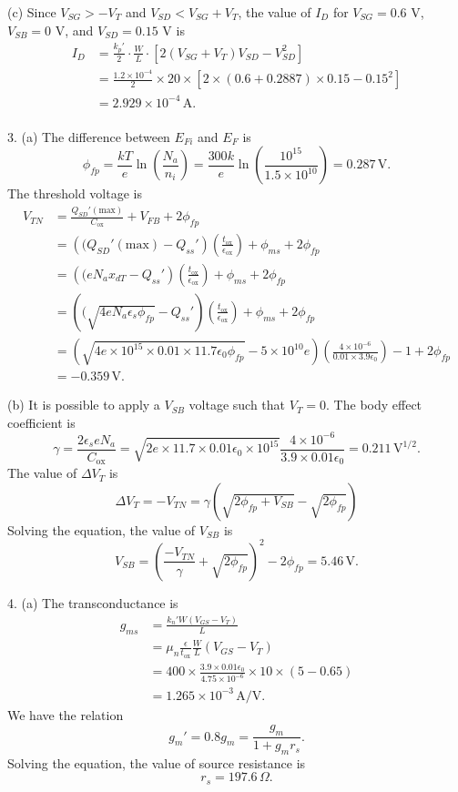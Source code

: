 \documentclass[a4paper]{article}
\begin{document}
(c) Since $V_{SG}>-V_T$ and $V_{SD}<V_{SG}+V_T$, the value of $I_D$ for $V_{SG}=0.6$ V, $V_{SB}=0$ V, and $V_{SD}=0.15$ V is
\[
    \begin{aligned}    
        I_D&=\frac{k_p'}{2}\cdot\frac{W}{L}\cdot\left[2\left(V_{SG}+V_T\right)V_{SD}-V_{SD}^2\right]\\
        &=\frac{1.2\times10^{-4}}{2}\times20\times\left[2\times\left(0.6+0.2887\right)\times0.15-0.15^2\right]\\
        &=2.929\times10^{-4}\,\text{A}.\\
    \end{aligned}
\]

3. (a) The difference between $E_{Fi}$ and $E_F$ is
\[\phi_{fp}=\frac{kT}{e}\ln{\left(\frac{N_a}{n_i}\right)}=\frac{300k}{e}\ln{\left(\frac{10^{15}}{1.5\times10^{10}}\right)}=0.287\,\text{V}.\]
The threshold voltage is
\[
    \begin{aligned}
        V_{TN}&=\frac{Q_{SD}'(\text{max})}{C_\text{ox}}+V_{FB}+2\phi_{fp}\\
        &=\left((Q_{SD}'(\text{max})-Q_{ss}'\right)\left(\frac{t_\text{ox}}{\epsilon_\text{ox}}\right)+\phi_{ms}+2\phi_{fp}\\
        &=\left((eN_ax_{dT}-Q_{ss}'\right)\left(\frac{t_\text{ox}}{\epsilon_\text{ox}}\right)+\phi_{ms}+2\phi_{fp}\\
        &=\left((\sqrt{4eN_a\epsilon_s\phi_{fp}}-Q_{ss}'\right)\left(\frac{t_\text{ox}}{\epsilon_\text{ox}}\right)+\phi_{ms}+2\phi_{fp}\\
        &=\left(\sqrt{4e\times10^{15}\times0.01\times11.7\epsilon_0\phi_{fp}}-5\times10^{10}e\right)\left(\frac{4\times10^{-6}}{0.01\times3.9\epsilon_0}\right)-1+2\phi_{fp}\\
        &=-0.359\,\text{V}.
    \end{aligned}
\]

(b) It is possible to apply a $V_{SB}$ voltage such that $V_T=0$. The body effect coefficient is
\[\gamma=\frac{2\epsilon_seN_a}{C_\text{ox}}=\sqrt{2e\times11.7\times0.01\epsilon_0\times10^{15}}\frac{4\times10^{-6}}{3.9\times0.01\epsilon_0}=0.211\,\text{V}^{1/2}.\]
The value of $\Delta V_T$ is
\[\Delta V_T=-V_{TN}=\gamma\left(\sqrt{2\phi_{fp}+V_{SB}}-\sqrt{2\phi_{fp}}\right)\]
Solving the equation, the value of $V_{SB}$ is
\[V_{SB}=\left(\frac{-V_{TN}}{\gamma}+\sqrt{2\phi_{fp}}\right)^2-2\phi_{fp}=5.46\,\text{V}.\]

4. (a) The transconductance is
\[
    \begin{aligned}    
        g_{ms}&=\frac{k_n'W(V_{GS}-V_T)}{L}\\
        &=\mu_n\frac{\epsilon}{t_\text{ox}}\frac{W}{L}(V_{GS}-V_T)\\
        &=400\times\frac{3.9\times0.01\epsilon_0}{4.75\times10^{-6}}\times10\times(5-0.65)\\
        &=1.265\times10^{-3}\,\mathrm{A/V}.
    \end{aligned}
\]
We have the relation
\[g_m'=0.8g_m=\frac{g_m}{1+g_mr_s}.\]
Solving the equation, the value of source resistance is
\[r_s=197.6\,\Omega.\]
\end{document}
